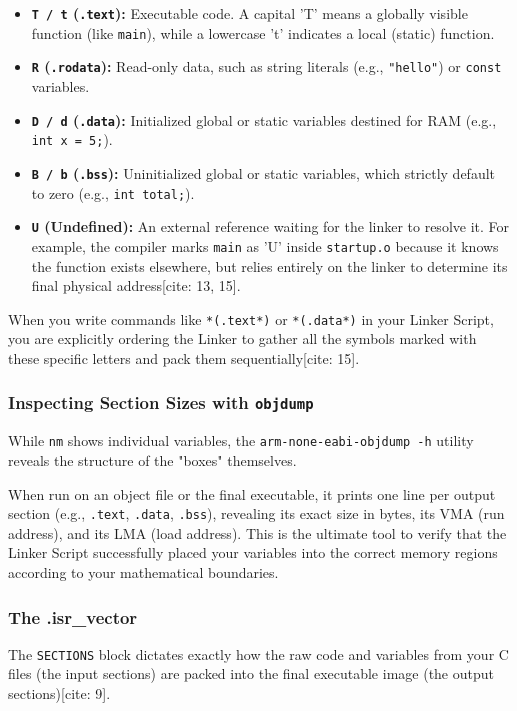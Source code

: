 \begin{itemize}
    \item \textbf{\texttt{T / t} (\texttt{.text}):} Executable code. A capital 'T' means a globally visible function (like \texttt{main}), while a lowercase 't' indicates a local (static) function.
    \item \textbf{\texttt{R} (\texttt{.rodata}):} Read-only data, such as string literals (e.g., \texttt{"hello"}) or \texttt{const} variables.
    \item \textbf{\texttt{D / d} (\texttt{.data}):} Initialized global or static variables destined for RAM (e.g., \texttt{int x = 5;}).
    \item \textbf{\texttt{B / b} (\texttt{.bss}):} Uninitialized global or static variables, which strictly default to zero (e.g., \texttt{int total;}).
    \item \textbf{\texttt{U} (Undefined):} An external reference waiting for the linker to resolve it. For example, the compiler marks \texttt{main} as 'U' inside \texttt{startup.o} because it knows the function exists elsewhere, but relies entirely on the linker to determine its final physical address[cite: 13, 15].
\end{itemize}

When you write commands like \texttt{*(.text*)} or \texttt{*(.data*)} in your Linker Script, you are explicitly ordering the Linker to gather all the symbols marked with these specific letters and pack them sequentially[cite: 15].

\subsubsection{Inspecting Section Sizes with \texttt{objdump}}
While \texttt{nm} shows individual variables, the \texttt{arm-none-eabi-objdump -h} utility reveals the structure of the "boxes" themselves. 

When run on an object file or the final executable, it prints one line per output section (e.g., \texttt{.text}, \texttt{.data}, \texttt{.bss}), revealing its exact size in bytes, its VMA (run address), and its LMA (load address). This is the ultimate tool to verify that the Linker Script successfully placed your variables into the correct memory regions according to your mathematical boundaries.

\subsubsection{The .isr\_vector}
The \texttt{SECTIONS} block dictates exactly how the raw code and variables from your C files (the input sections) are packed into the final executable image (the output sections)[cite: 9].

